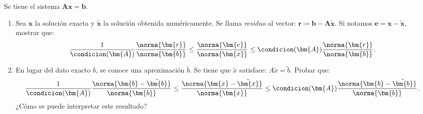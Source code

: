 \begin{enunciado}{\ejercicio}
  Se tiene el sistema $\bm{A}\bm{x} = \bm{b}$.
  \begin{enumerate}[label=(\alph*)]
    \item Sea  $\bm{x}$ la solución exacta y $\tilde{\bm{x}}$ la solución obtenida numéricamente.
          Se llama \textit{residuo} al vector: $\bm{r} \coloneq \bm{b} - \bm{A}\tilde{\bm{x}}$.
          Si notamos $\bm{e} = \bm{x} - \tilde{\bm{x}}$, mostrar que:
          $$
            \frac{1}{\condicion(\bm{A})}  \frac{\norma{\bm{r}}}{\norma{\bm{b}}}
            \leq
            \frac{\norma{\bm{e}}}{\norma{\bm{x}}}
            \leq
            \condicion(\bm{A}) \frac{\norma{\bm{r}}}{\norma{\bm{b}}}.
          $$

    \item En lugar del dato exacto $b$, se conoce una aproximación $\tilde{b}$.
          Se tiene que $\tilde{x}$ satisface: $A\tilde{x} = \tilde{b}.$
          Probar que:
          $$
            \frac{1}{\condicion(\bm{A})}  \frac{\norma{\bm{b} - \tilde{\bm{b}}}}{\norma{\bm{b}}}
            \leq
            \frac{\norma{\bm{x} - \tilde{\bm{x}}}}{\norma{\bm{x}}}
            \leq
            \condicion(\bm{A})  \frac{\norma{\bm{b} - \tilde{\bm{b}}}}{\norma{\bm{b}}}.
          $$
          ¿Cómo se puede interpretar este resultado?
  \end{enumerate}
\end{enunciado}

\medskip


